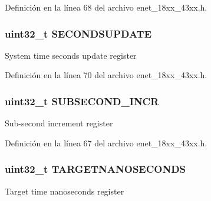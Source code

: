 Definición en la línea 68 del archivo enet\+\_\+18xx\+\_\+43xx.\+h.

\subsubsection[{\texorpdfstring{S\+E\+C\+O\+N\+D\+S\+U\+P\+D\+A\+TE}{SECONDSUPDATE}}]{ uint32\+\_\+t S\+E\+C\+O\+N\+D\+S\+U\+P\+D\+A\+TE}\hypertarget{struct_l_p_c___e_n_e_t___t_a8b15cea74eada05c941392b94fe06d2a}{}\label{struct_l_p_c___e_n_e_t___t_a8b15cea74eada05c941392b94fe06d2a}
System time seconds update register 

Definición en la línea 70 del archivo enet\+\_\+18xx\+\_\+43xx.\+h.

\subsubsection[{\texorpdfstring{S\+U\+B\+S\+E\+C\+O\+N\+D\+\_\+\+I\+N\+CR}{SUBSECOND_INCR}}]{ uint32\+\_\+t S\+U\+B\+S\+E\+C\+O\+N\+D\+\_\+\+I\+N\+CR}\hypertarget{struct_l_p_c___e_n_e_t___t_a8cfa1fac247a4eb2a1c409b087e5868e}{}\label{struct_l_p_c___e_n_e_t___t_a8cfa1fac247a4eb2a1c409b087e5868e}
Sub-\/second increment register 

Definición en la línea 67 del archivo enet\+\_\+18xx\+\_\+43xx.\+h.

\subsubsection[{\texorpdfstring{T\+A\+R\+G\+E\+T\+N\+A\+N\+O\+S\+E\+C\+O\+N\+DS}{TARGETNANOSECONDS}}]{ uint32\+\_\+t T\+A\+R\+G\+E\+T\+N\+A\+N\+O\+S\+E\+C\+O\+N\+DS}\hypertarget{struct_l_p_c___e_n_e_t___t_a1e9803d68624d654aa161cbdc510d329}{}\label{struct_l_p_c___e_n_e_t___t_a1e9803d68624d654aa161cbdc510d329}
Target time nanoseconds register 

